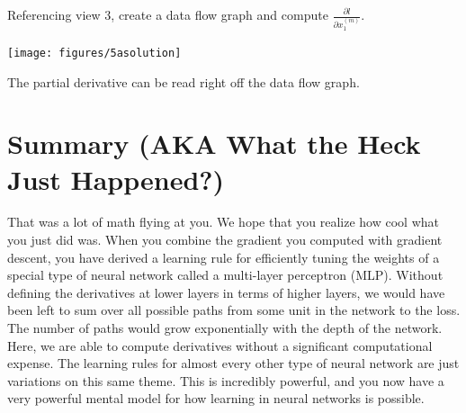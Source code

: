 \documentclass[assignment06_Solutions]{subfiles}
\begin{document}
\begin{exercise}[(75 minutes)]
\item Referencing view 3, create a data flow graph and compute $\frac{\partial l}{\partial x^{(m)}_1}$.
\begin{boxedsolution}
\begin{center}
\texttt{[image: figures/5asolution]}
\end{center}
The partial derivative can be read right off the data flow graph.
\end{boxedsolution}

\ees
\end{exercise}

\section{Summary (AKA What the Heck Just Happened?)}
That was a lot of math flying at you.  We hope that you realize how cool what you just did was.  When you combine the gradient you computed with gradient descent, you have derived a learning rule for efficiently tuning the weights of a special type of neural network called a multi-layer perceptron (MLP).  Without defining the derivatives at lower layers in terms of higher layers, we would have been left to sum over all possible paths from some unit in the network to the loss.  The number of paths would grow exponentially with the depth of the network.  Here, we are able to compute derivatives without a significant computational expense.  The learning rules for almost every other type of neural network are just variations on this same theme.  This is incredibly powerful, and you now have a very powerful mental model for how learning in neural networks is possible.
%
%
%
%
%
%
\end{document}
